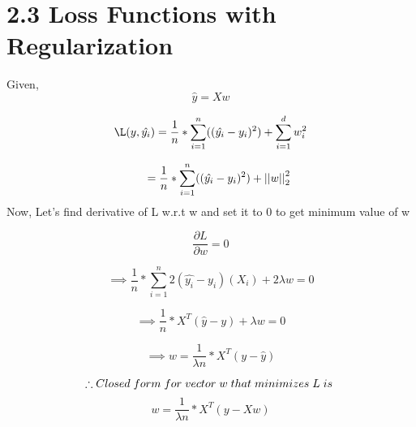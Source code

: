 \section*{2.3 Loss Functions with Regularization}
Given,
\\
\[\hat{y} = Xw\]

\[\L(y,\hat{y_i}) = \frac{1}{n} * \sum_{i=1}^n ((\hat{y_i} - y_i)^{2}) +  \sum_{i=1}^d w_i^{2}\]

\[\hspace{0.5cm}  = \frac{1}{n} * \sum_{i=1}^n ((\hat{y_i} - y_i)^{2}) + {||w||}_{2}^{2} \]
Now, Let’s find derivative of L w.r.t w and set it to 0 to get minimum value of w 

\[\frac {\partial L}{\partial w} = 0\]

\[\implies \frac{1}{n} * \sum_{i=1}^n 2(\hat{y_i} - {y_i})({X_i}) + 2\lambda w = 0 \]

\[\implies \frac{1}{n} * X^{T} (\hat{y}-y) + \lambda w = 0\]

\[\implies w = \frac{1}{\lambda n} * X^{T}(y-\hat{y})\]

\[\therefore Closed \hspace{0.1cm} form\hspace{0.1cm} for\hspace{0.1cm} vector\hspace{0.1cm} w\hspace{0.1cm} that\hspace{0.1cm} minimizes\hspace{0.1cm} L\hspace{0.1cm} is\hspace{0.1cm} \]
\[w = \frac{1}{\lambda n} * X^{T}(y-Xw)\]
\\


